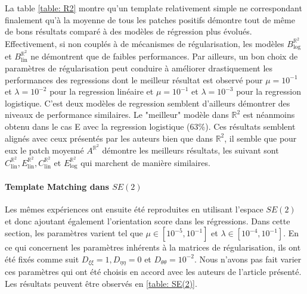 \documentclass{article}
\begin{document}
La table \ref{table: R2} montre qu'un template relativement simple ne correspondant finalement qu'à la moyenne de tous les patches positifs démontre tout de même de bons
résultats comparé à des modèles de régression plus évolués. Effectivement, si non couplés à de mécanismes de régularisation, les modèles $B_{\text{log}}^{\mathbb{R}^2} $ et 
$B_{\text{lin}}^{\mathbb{R}^2} $ ne démontrent que de faibles performances. Par ailleurs, un bon choix de paramètres de régularisation peut conduire à améliorer drastiquement les 
performances des regressions dont le meilleur résultat est observé pour $\mu = 10^{-1}$ et $\lambda = 10^{-2}$ pour la regression linéaire et $\mu = 10^{-1}$ et $\lambda = 10^{-3}$ pour la regression logistique.
C'est deux modèles de regression semblent d'ailleurs démontrer des niveaux de performance similaires.
Le "meilleur" modèle dans $\mathbb{R}^2$ est néanmoins obtenu dans le cas E avec la regression logistique (63\%). Ces résultats semblent alignés avec ceux présentés par les auteurs bien que dans $\mathbb{R}^2$, 
il semble que pour eux le patch moyenné $A^{\mathbb{R}^2}$ démontre les meilleurs résultats, les
suivant sont $C_{\text{lin}}^{\mathbb{R}^2}, E_{\text{lin}}^{\mathbb{R}^2},
C_{\text{lin}}^{\mathbb{R}^2}$ et $E_{\text{log}}^{\mathbb{R}^2}$ qui marchent de manière 
similaires.


\paragraph{Template Matching dans $SE(2)$}
Les mêmes expériences ont ensuite été reproduites en utilisant l'espace $SE(2)$ et donc ajoutant également l'orientation score dans les régressions.
Dans cette section, les paramètres varient tel que $\mu \in [10^{-5}, 10^{-1}]$ et $\lambda \in [10^{-4}, 10^{-1}]$. En ce qui concernent les paramètres inhérents à la matrices de 
régularisation, ils ont été fixés comme suit $D_{\xi \xi}=1, D_{\eta \eta} = 0$ et $D_{\theta \theta} = 10^{-2}$. Nous n'avons pas fait varier ces paramètres qui ont été choisis en accord avec les auteurs 
de l'article présenté. Les résultats peuvent être observés en \ref{table: SE(2)}.
\end{document}
